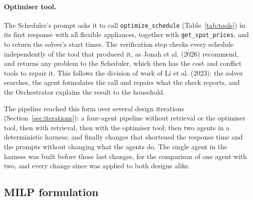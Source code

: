 \documentclass[12pt,a4paper]{report}
\begin{document}
\paragraph{Optimiser tool.} The Scheduler's prompt asks it to call
\texttt{optimize\_schedule} (Table~\ref{tab:tools}) in its first
response with all flexible appliances, together with
\texttt{get\_spot\_prices}, and to return the solver's start times. The
verification step checks every schedule independently of the tool that
produced it, as Jonah et al. (2026) recommend, and returns any problem
to the Scheduler, which then has the cost and conflict tools to repair
it. This follows the division of work of Li et al. (2023): the solver
searches, the agent formulates the call and repairs what the check
reports, and the Orchestrator explains the result to the household.

The pipeline reached this form over several design iterations
(Section~\ref{sec:iterations}): a four-agent pipeline without retrieval
or the optimiser tool, then with retrieval, then with the optimiser
tool; then two agents in a deterministic harness; and finally changes
that shortened the response time and the prompts without changing what
the agents do. The single agent in the harness was built before those
last changes, for the comparison of one agent with two, and every
change since was applied to both designs alike.

\subsection{MILP formulation}
\label{sec:milp}
\end{document}
